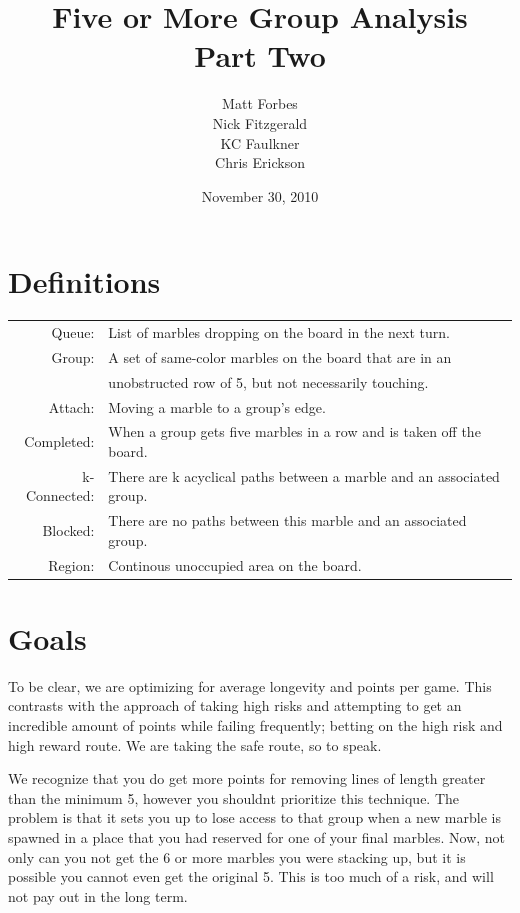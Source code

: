 \documentclass[a4paper,12pt]{article}
\begin{document}
\title{Five or More Group Analysis\\ Part Two}
\date{November 30, 2010}
\author{Matt Forbes \\ Nick Fitzgerald \\ KC Faulkner \\ Chris Erickson}
\maketitle

\section*{Definitions}
\begin{tabular}{r l}
    Queue:& List of marbles dropping on the board in the next turn. \\
    Group:& A set of same-color marbles on the board that are in an\\
    {}& unobstructed row of 5, but not necessarily touching. \\
    Attach:& Moving a marble to a group's edge.\\
    Completed:& When a group gets five marbles in a row and is taken off the board.\\
    k-Connected:& There are k acyclical paths between a marble and an associated group.\\
    Blocked:& There are no paths between this marble and an associated group.\\
    Region:& Continous unoccupied area on the board. 
    
\end{tabular}


\section*{Goals}

To be clear, we are optimizing for average longevity and points per
game. This contrasts with the approach of taking high risks and
attempting to get an incredible amount of points while failing
frequently; betting on the high risk and high reward route. We are
taking the safe route, so to speak.

We recognize that you do get more points for removing lines of length
greater than the minimum 5, however you shouldnt prioritize this
technique. The problem is that it sets you up to lose access to that
group when a new marble is spawned in a place that you had reserved
for one of your final marbles. Now, not only can you not get the 6 or
more marbles you were stacking up, but it is possible you cannot even
get the original 5. This is too much of a risk, and will not pay out
in the long term.
\end{document}
